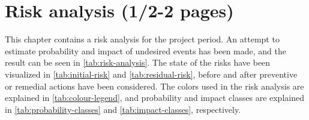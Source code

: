 \documentclass[informationsecurity]{gucmasterproject}
\begin{document}
\chapter{Risk analysis (1/2-2 pages)}
This chapter contains a risk analysis for the project period.
An attempt to estimate probability and impact of undesired events has been made, and the result can be seen in \autoref{tab:risk-analysis}.
The state of the risks have been visualized in \autoref{tab:initial-risk} and \autoref{tab:residual-risk}, before and after preventive or remedial actions have been considered.
The colors used in the risk analysis are explained in \autoref{tab:colour-legend}, and probability and impact classes are explained in \autoref{tab:probability-classes} and \autoref{tab:impact-classes}, respectively.
\end{document}
